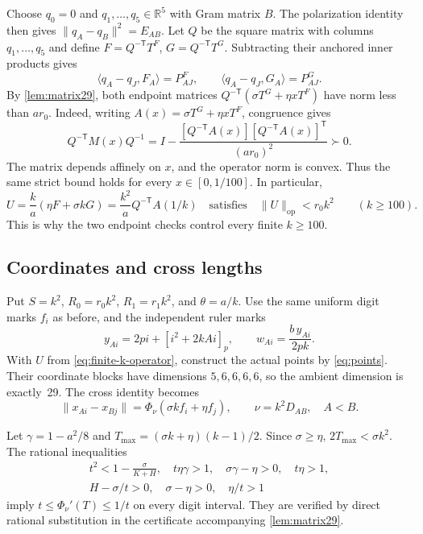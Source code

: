\documentclass[11pt]{article}
\numberwithin{equation}{section}
\theoremstyle{definition}\newtheorem{definition}[theorem]{Definition}
\theoremstyle{remark}\newtheorem{remark}[theorem]{Remark}
\newcommand{\R}{\mathbb R}\newcommand{\N}{\mathbb N}
\newcommand{\ip}[2]{\langle #1,#2\rangle}
\newcommand{\norm}[1]{\lVert #1\rVert}
\newcommand{\opnorm}[1]{\lVert #1\rVert_{\mathrm{op}}}
\newcommand{\T}{\mathsf T}\newcommand{\one}{\mathbf1}
\begin{document}
Choose $q_0=0$ and $q_1,\ldots,q_5\in\R^5$ with Gram matrix $B$. The
polarization identity then gives $\norm{q_A-q_B}^2=E_{AB}$. Let $Q$ be the
square matrix with columns $q_1,\ldots,q_5$ and define
$F=Q^{-\T}T^F$, $G=Q^{-\T}T^G$. Subtracting their anchored inner products
gives
\[
 \ip{q_A-q_J}{F_A}=P^F_{AJ},\qquad
 \ip{q_A-q_J}{G_A}=P^G_{AJ}.
\]
By \cref{lem:matrix29}, both endpoint matrices
$Q^{-\T}(\sigma T^G+\eta xT^F)$ have norm less than $ar_0$.
Indeed, writing $A(x)=\sigma T^G+\eta xT^F$, congruence gives
\[
 Q^{-\T}M(x)Q^{-1}
 =I-\frac{[Q^{-\T}A(x)][Q^{-\T}A(x)]^\T}{(ar_0)^2}\succ0.
\]
The matrix depends affinely on $x$, and the operator norm is convex.
Thus the same strict bound holds for every $x\in[0,1/100]$. In particular,
\begin{equation}\label{eq:finite-k-operator}
 U=\frac{k}{a}(\eta F+\sigma kG)
   =\frac{k^2}{a}Q^{-\T}A(1/k)
 \quad\text{satisfies}\quad \opnorm U<r_0k^2
 \qquad(k\ge100).
\end{equation}
This is why the two endpoint checks control every finite $k\ge100$.

\subsection{Coordinates and cross lengths}

Put $S=k^2$, $R_0=r_0k^2$, $R_1=r_1k^2$, and $\theta=a/k$. Use the same
uniform digit marks $f_i$ as before, and the independent ruler marks
\begin{equation}\label{eq:ruler29}
 y_{Ai}=2pi+[i^2+2kAi]_p,\qquad w_{Ai}=\frac{b\,y_{Ai}}{2pk}.
\end{equation}
With $U$ from \eqref{eq:finite-k-operator}, construct the actual points by
\eqref{eq:points}. Their coordinate blocks have dimensions $5,6,6,6,6$,
so the ambient dimension is exactly~29. The cross identity becomes
\begin{equation}\label{eq:r29-cross}
 \norm{x_{Ai}-x_{Bj}}=\Phi_\nu(\sigma kf_i+\eta f_j),
 \qquad\nu=k^2D_{AB},\quad A<B.
\end{equation}

Let $\gamma=1-a^2/8$ and $T_{\max}=(\sigma k+\eta)(k-1)/2$.
Since $\sigma\ge\eta$, $2T_{\max}<\sigma k^2$. The rational inequalities
\begin{equation}\label{eq:r29-cross-guards}
\begin{gathered}
 t^2<1-\frac{\sigma}{K+H},\quad t\eta\gamma>1,\quad
 \sigma\gamma-\eta>0,\quad t\eta>1,\\
 H-\sigma/t>0,\quad\sigma-\eta>0,\quad\eta/t>1
\end{gathered}
\end{equation}
imply $t\le\Phi_\nu'(T)\le1/t$ on every digit interval. They are verified
by direct rational substitution in the certificate accompanying
\cref{lem:matrix29}.
\end{document}
